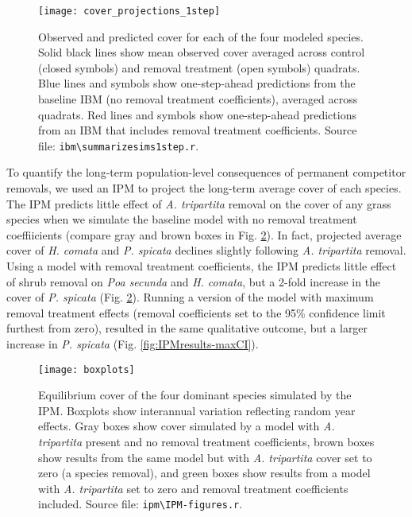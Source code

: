 \documentclass[11pt]{article}
\begin{document}
\begin{doublespacing}
 \begin{figure}[tbp]
 \centering
 \texttt{[image: cover\_projections\_1step]}
 \caption{Observed and predicted cover for each of the four modeled species. Solid black lines show mean observed cover averaged across control (closed symbols) and removal treatment (open symbols) quadrats. Blue lines and symbols show one-step-ahead predictions from the baseline IBM (no removal treatment coefficients), averaged across quadrats. Red lines and symbols show one-step-ahead predictions from an IBM that includes removal treatment coefficients. Source file: \texttt{ibm\textbackslash summarize\textunderscore sims1step.r}. }
 \label{fig:IBM1step}
 \end{figure}
 

To quantify the long-term population-level consequences of permanent competitor removals, we used an IPM to project the long-term average cover of each species. The IPM predicts little effect of \textit{A. tripartita} removal on the cover of any grass species when we simulate the baseline model with no removal treatment coeffiicients (compare gray and brown boxes in Fig. \ref{fig:IPMresults}). In fact, projected average cover of \textit{H. comata} and \textit{P. spicata} declines slightly following \textit{A. tripartita} removal. Using a model with removal treatment coefficients, the IPM predicts little effect of shrub removal on \textit{Poa secunda} and \textit{H. comata}, but a 2-fold increase in the cover of \textit{P. spicata} (Fig. \ref{fig:IPMresults}). Running a version of the model with maximum removal treatment effects (removal coefficients set to the 95\% confidence limit furthest from zero), resulted in the same qualitative outcome, but a larger increase in \textit{P. spicata} (Fig. \ref{fig:IPMresults-maxCI}). 


 \begin{figure}[tbp]
 \centering
 \texttt{[image: boxplots]}
 \caption{Equilibrium cover of the four dominant species simulated by the IPM. Boxplots show interannual variation reflecting random year effects. Gray boxes show cover simulated by a model with \textit{A. tripartita} present and no removal treatment coefficients, brown boxes show results from the same model but with \textit{A. tripartita} cover set to zero (a species removal), and green boxes show results from a model with \textit{A. tripartita} set to zero and removal treatment coefficients included. Source file: \texttt{ipm\textbackslash IPM-figures.r}.}
 \label{fig:IPMresults}
 \end{figure}
 

\end{doublespacing}
\end{document}
